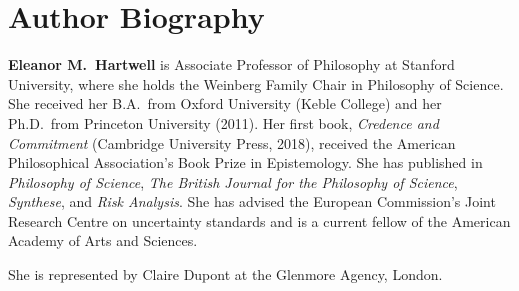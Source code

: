 \section{Author Biography}

\textbf{Eleanor M.\ Hartwell} is Associate Professor of Philosophy at Stanford University, where she holds the Weinberg Family Chair in Philosophy of Science. She received her B.A.\ from Oxford University (Keble College) and her Ph.D.\ from Princeton University (2011). Her first book, \textit{Credence and Commitment} (Cambridge University Press, 2018), received the American Philosophical Association's Book Prize in Epistemology. She has published in \textit{Philosophy of Science}, \textit{The British Journal for the Philosophy of Science}, \textit{Synthese}, and \textit{Risk Analysis}. She has advised the European Commission's Joint Research Centre on uncertainty standards and is a current fellow of the American Academy of Arts and Sciences.

She is represented by Claire Dupont at the Glenmore Agency, London.

